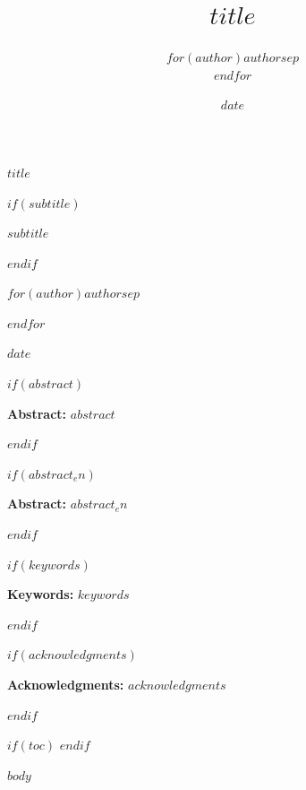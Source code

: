 \documentclass[11pt]{article}
\title{$title$}
\author{$for(author)$$author$$sep$ \\ $endfor$}
\date{$date$}
\renewcommand{\maketitle}{
  \begin{center}
  \vspace*{1cm}
  
  \begin{minipage}{\textwidth}
  \centering
  \fontsize{20}{26}\selectfont\textbf{$title$}
  \end{minipage}
  
  \vspace{2.4cm}
  
  $if(subtitle)$
  \begin{minipage}{\textwidth}
  \centering
  \fontsize{13}{16}\selectfont\itshape $subtitle$
  \end{minipage}
  $endif$
  
  \vspace{2.6cm}
  
  \begin{minipage}{\textwidth}
  \centering
  \Large
  $for(author)$$author$$sep$ \par $endfor$
  \end{minipage}
  
  \vspace{2.6cm}
  
  \Large $date$
  
  \end{center}
  \vspace{1cm}
}
\begin{document}
\maketitle
\thispagestyle{firstpage}

$if(abstract)$
\begin{center}
\begin{minipage}{0.85\textwidth}
\noindent \textbf{Abstract:} $abstract$
\end{minipage}
\end{center}
\vspace{0.5cm}
$endif$

$if(abstract_en)$
\begin{center}
\begin{minipage}{0.85\textwidth}
\noindent \textbf{Abstract:} $abstract_en$
\end{minipage}
\end{center}
\vspace{0.5cm}
$endif$


$if(keywords)$
\begin{center}
\begin{minipage}{0.85\textwidth}
\noindent \textbf{Keywords:} $keywords$
\end{minipage}
\end{center}
\vspace{0.5cm}
$endif$

$if(acknowledgments)$
\begin{center}
\begin{minipage}{0.85\textwidth}
\noindent \textbf{Acknowledgments:} $acknowledgments$
\end{minipage}
\end{center}
\vspace{1cm}
$endif$

$if(toc)$
\clearpage
\tableofcontents
\clearpage
$endif$

\clearpage
\pagestyle{fancy}

$body$

\printbibliography[title={References}]
\end{document}
